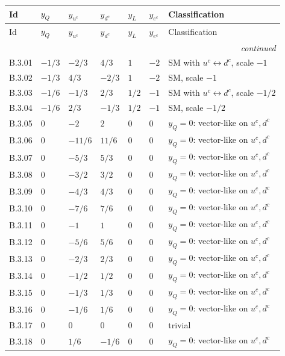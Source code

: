 {\scriptsize\setlength{\tabcolsep}{3pt}
\begin{longtable}{@{}llllll>{\raggedright\arraybackslash}p{6.5cm}@{}}
\toprule
Id & $y_Q$ & $y_{u^c}$ & $y_{d^c}$ & $y_L$ & $y_{e^c}$ & Classification \\
\midrule\endfirsthead
\toprule
Id & $y_Q$ & $y_{u^c}$ & $y_{d^c}$ & $y_L$ & $y_{e^c}$ & Classification \\
\midrule\endhead
\midrule\multicolumn{7}{r}{\emph{continued}}\\\endfoot
\bottomrule\endlastfoot
B.3.01 & $-1/3$ & $-2/3$ & $4/3$ & $1$ & $-2$ & SM with $u^c\leftrightarrow d^c$, scale $-1$ \\
B.3.02 & $-1/3$ & $4/3$ & $-2/3$ & $1$ & $-2$ & SM, scale $-1$ \\
B.3.03 & $-1/6$ & $-1/3$ & $2/3$ & $1/2$ & $-1$ & SM with $u^c\leftrightarrow d^c$, scale $-1/2$ \\
B.3.04 & $-1/6$ & $2/3$ & $-1/3$ & $1/2$ & $-1$ & SM, scale $-1/2$ \\
B.3.05 & $0$ & $-2$ & $2$ & $0$ & $0$ & $y_Q=0$: vector-like on $u^c,d^c$ \\
B.3.06 & $0$ & $-11/6$ & $11/6$ & $0$ & $0$ & $y_Q=0$: vector-like on $u^c,d^c$ \\
B.3.07 & $0$ & $-5/3$ & $5/3$ & $0$ & $0$ & $y_Q=0$: vector-like on $u^c,d^c$ \\
B.3.08 & $0$ & $-3/2$ & $3/2$ & $0$ & $0$ & $y_Q=0$: vector-like on $u^c,d^c$ \\
B.3.09 & $0$ & $-4/3$ & $4/3$ & $0$ & $0$ & $y_Q=0$: vector-like on $u^c,d^c$ \\
B.3.10 & $0$ & $-7/6$ & $7/6$ & $0$ & $0$ & $y_Q=0$: vector-like on $u^c,d^c$ \\
B.3.11 & $0$ & $-1$ & $1$ & $0$ & $0$ & $y_Q=0$: vector-like on $u^c,d^c$ \\
B.3.12 & $0$ & $-5/6$ & $5/6$ & $0$ & $0$ & $y_Q=0$: vector-like on $u^c,d^c$ \\
B.3.13 & $0$ & $-2/3$ & $2/3$ & $0$ & $0$ & $y_Q=0$: vector-like on $u^c,d^c$ \\
B.3.14 & $0$ & $-1/2$ & $1/2$ & $0$ & $0$ & $y_Q=0$: vector-like on $u^c,d^c$ \\
B.3.15 & $0$ & $-1/3$ & $1/3$ & $0$ & $0$ & $y_Q=0$: vector-like on $u^c,d^c$ \\
B.3.16 & $0$ & $-1/6$ & $1/6$ & $0$ & $0$ & $y_Q=0$: vector-like on $u^c,d^c$ \\
B.3.17 & $0$ & $0$ & $0$ & $0$ & $0$ & trivial \\
B.3.18 & $0$ & $1/6$ & $-1/6$ & $0$ & $0$ & $y_Q=0$: vector-like on $u^c,d^c$ \\

\end{longtable}}
